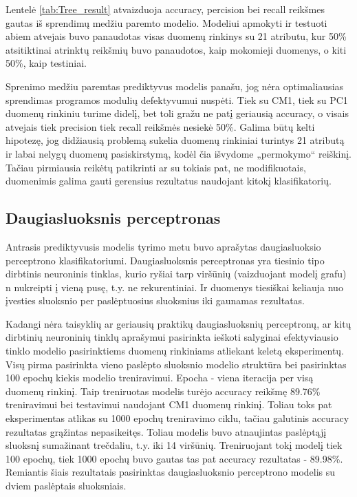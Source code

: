 \documentclass{VUMIFPSbakalaurinis}
\begin{document}
Lentelė \ref{tab:Tree_result} atvaizduoja accuracy, percision bei recall reikšmes gautas iš sprendimų medžiu paremto modelio. Modeliui apmokyti ir testuoti abiem atvejais buvo panaudotas visas duomenų rinkinys su 21 atributu, kur 50\% atsitiktinai atrinktų reikšmių buvo panaudotos, kaip mokomieji duomenys, o kiti 50\%, kaip testiniai.

Sprenimo medžiu paremtas prediktyvus modelis panašu, jog nėra optimaliausias sprendimas programos modulių defektyvumui nuspėti. Tiek su CM1, tiek su PC1 duomenų rinkiniu turime didelį, bet toli gražu ne patį geriausią accuracy, o visais atvejais tiek precision tiek recall reikšmės nesiekė 50\%. Galima būtų kelti hipotezę, jog didžiausią problemą sukelia duomenų rinkiniai turintys 21 atributą ir labai nelygų duomenų pasiskirstymą, kodėl čia išvydome „permokymo“ reiškinį. Tačiau pirmiausia reikėtų patikrinti ar su tokiais pat, ne modifikuotais, duomenimis galima gauti gerensius rezultatus naudojant kitokį klasifikatorių.

\subsection{Daugiasluoksnis perceptronas}
Antrasis prediktyvusis modelis tyrimo metu buvo aprašytas daugiasluoksio perceptrono klasifikatoriumi. Daugiasluoksnis perceptronas yra tiesinio tipo dirbtinis neuroninis tinklas, kurio ryšiai tarp viršūnių (vaizduojant modelį grafu) n nukreipti į vieną pusę, t.y. ne rekurentiniai. Ir duomenys tiesiškai keliauja nuo įvesties sluoksnio per paslėptuosius sluoksnius iki gaunamas rezultatas.

Kadangi nėra taisyklių ar geriausių praktikų daugiasluoksnių perceptronų, ar kitų dirbtinių neuroninių tinklų aprašymui pasirinkta ieškoti salyginai efektyviausio tinklo modelio pasirinktiems duomenų rinkiniams atliekant keletą eksperimentų. Visų pirma pasirinkta vieno paslėpto sluoksnio modelio struktūra bei pasirinktas 100 epochų kiekis modelio treniravimui. Epocha - viena iteracija per visą duomenų rinkinį. Taip treniruotas modelis turėjo accuracy reikšmę 89.76\% treniravimui bei testavimui naudojant CM1 duomenų rinkinį. Toliau toks pat eksperimentas atlikas su 1000 epochų treniravimo ciklu, tačiau galutinis accuracy rezultatas grąžintas nepasikeitęs. Toliau modelis buvo atnaujintas paslėptąjį sluoksnį sumažinant trečdaliu, t.y. iki 14 viršūnių. Treniruojant tokį modelį tiek 100 epochų, tiek 1000 epochų buvo gautas tas pat accuracy rezultatas - 89.98\%. Remiantis šiais rezultatais pasirinktas daugiasluoksnio perceptrono modelis su dviem paslėptais sluoksniais.
\end{document}

